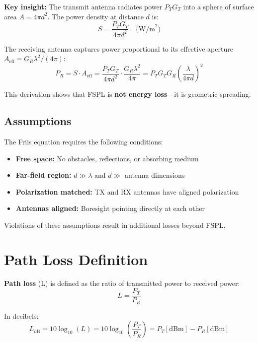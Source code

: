 \textbf{Key insight:} The transmit antenna radiates power $P_T G_T$ into a sphere of surface area $A = 4\pi d^2$. The power density at distance $d$ is:
\begin{equation}
S = \frac{P_T G_T}{4\pi d^2} \quad \text{(W/m}^2\text{)}
\label{eq:power-density}
\end{equation}

The receiving antenna captures power proportional to its effective aperture $A_{\text{eff}} = G_R \lambda^2 / (4\pi)$:
\begin{equation}
P_R = S \cdot A_{\text{eff}} = \frac{P_T G_T}{4\pi d^2} \cdot \frac{G_R \lambda^2}{4\pi} = P_T G_T G_R \left(\frac{\lambda}{4\pi d}\right)^2
\end{equation}

This derivation shows that FSPL is \textbf{not energy loss}---it is geometric spreading.

\subsection{Assumptions}

\begin{warningbox}
The Friis equation requires the following conditions:
\begin{itemize}
\item \textbf{Free space:} No obstacles, reflections, or absorbing medium
\item \textbf{Far-field region:} $d \gg \lambda$ and $d \gg$ antenna dimensions
\item \textbf{Polarization matched:} TX and RX antennas have aligned polarization
\item \textbf{Antennas aligned:} Boresight pointing directly at each other
\end{itemize}

Violations of these assumptions result in additional losses beyond FSPL.
\end{warningbox}

\section{Path Loss Definition}
\label{sec:path-loss}

\textbf{Path loss} (L) is defined as the ratio of transmitted power to received power:
\begin{equation}
L = \frac{P_T}{P_R}
\label{eq:path-loss}
\end{equation}

In decibels:
\begin{equation}
L_{\text{dB}} = 10\log_{10}(L) = 10\log_{10}\left(\frac{P_T}{P_R}\right) = P_T[\text{dBm}] - P_R[\text{dBm}]
\label{eq:path-loss-db}
\end{equation}

